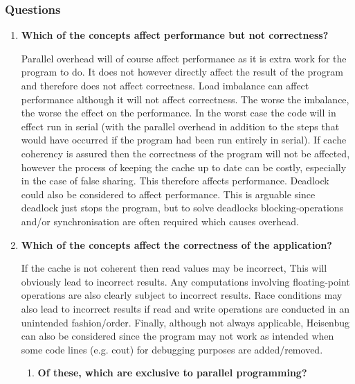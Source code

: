 \documentclass[10pt, letterpaper, twoside]{article}
\begin{document}
\begin{titlepage}
\begin{enumerate}
\begin{enumerate}
\end{enumerate} 

\end{enumerate} 

\subsubsection{Questions}

\begin{enumerate}
	\item\textbf{Which of the concepts affect performance but not correctness?} 
	
	Parallel overhead will of course affect performance as it is extra work for the program to do. It does not however directly affect the result of the program and therefore does not affect correctness. Load imbalance can affect performance although it will not affect correctness. The worse the imbalance, the worse the effect on the performance. In the worst case the code will in effect run in serial (with the parallel overhead in addition to the steps that would have
occurred if the program had been run entirely in serial). If cache coherency is assured then the correctness of the program will not be affected, however the process of keeping the cache up to date can be costly, especially in the case of false sharing. This therefore affects performance. Deadlock could also be considered to affect
performance. This is arguable since deadlock just stops the program, but to solve deadlocks blocking-operations and/or synchronisation are often required which causes overhead. \\
	
	\item\textbf{Which of the concepts affect the correctness of the application?} 
	
	If the cache is not coherent then read values may be incorrect, This will obviously lead to incorrect results. Any computations involving floating-point operations are also clearly subject to incorrect results. Race conditions may also lead to incorrect results if read and write operations are conducted in an unintended fashion/order. Finally, although not always applicable, Heisenbug can also be considered since the program may not work as intended when some code lines (e.g. cout) for debugging purposes are added/removed.  
	
\begin{enumerate}
\item \textbf{Of these, which are exclusive to parallel programming?} 


\end{enumerate}
\end{enumerate}
\end{titlepage}
\end{document}
